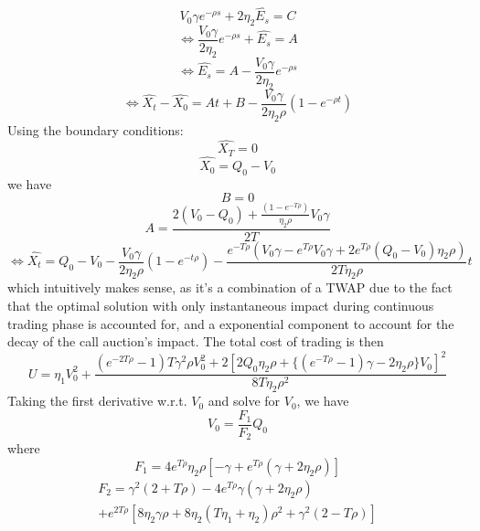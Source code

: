 \documentclass{article}
\begin{document}
\[
  V_0 \gamma e^{-\rho s}  + 2\eta_2\hat{E_s} = C
\]
\[
  \Leftrightarrow \frac{V_0 \gamma}{2\eta_2} e^{-\rho s}  + \hat{E_s} = A
\]
\[
  \Leftrightarrow \hat{E_s} = A - \frac{V_0 \gamma}{2\eta_2} e^{-\rho s}
\]
\[
  \Leftrightarrow \hat{X_t} - \hat{X_0} = At + B - \frac{V_0 \gamma}{2\eta_2 \rho} (1 - e^{-\rho t})
\]
Using the boundary conditions:
\[
  \hat{X_T} = 0
\]
\[
  \hat{X_0} = Q_0 - V_0
\]
we have
\[
  B = 0
\]
\[
  A = \frac{2 (V_0 - Q_0) + \frac{(1 - e^{-T \rho})}{\eta_2 \rho} V_0 \gamma} {2 T}
\]
\[
  \Leftrightarrow \hat{X_t} = Q_0 - V_0  - \frac{V_0 \gamma}{2 \eta_2 \rho}(1 - e^{-t \rho}) - \frac{e^{-T \rho} (V_0 \gamma - e^{T \rho}V_0 \gamma + 2 e^{T \rho} (Q_0 - V_0) \eta_2 \rho )}{2 T \eta_2 \rho} t
\]
which intuitively makes sense, as it's a combination of a TWAP due to the fact that the optimal solution with only instantaneous impact during continuous trading phase is accounted for, and a exponential component to account for the decay of the call auction's impact. The total cost of trading is then
\[
  U = \eta_1 V_0^2 + \frac{(e^{-2 T \rho} - 1) T \gamma^2 \rho V_0^2 + 2 [2 Q_0 \eta_2 \rho + \{(e^{-T \rho} - 1) \gamma - 2 \eta_2 \rho\} V_0]^2}{8 T \eta_2 \rho^2}
\]
Taking the first derivative w.r.t. $V_0$ and solve for $V_0$, we have
\[
  V_0 = \frac{F_1}{F_2} Q_0
\]
where
\[
  F_1 = 4 e^{T \rho} \eta_2 \rho [-\gamma + e^{T \rho} (\gamma + 2 \eta_2 \rho)]
\]
\begin{equation}
  \begin{split}
    F_2 = \gamma^2 (2 + T \rho) - 4 e^{T \rho} \gamma (\gamma + 2 \eta_2 \rho)\ \\
    + e^{2 T \rho} [8 \eta_2 \gamma \rho + 8 \eta_2 (T \eta_1 + \eta_2) \rho^2 + \gamma^2 (2 - T \rho)]
  \end{split}
\end{equation}
\end{document}

